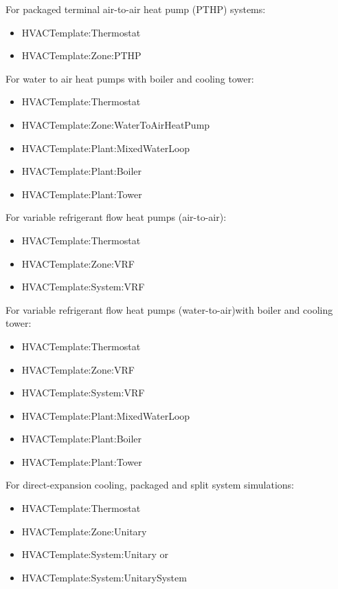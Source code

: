 For packaged terminal air-to-air heat pump (PTHP) systems:

\begin{itemize}
\item
  HVACTemplate:Thermostat
\item
  HVACTemplate:Zone:PTHP
\end{itemize}

For water to air heat pumps with boiler and cooling tower:

\begin{itemize}
\item
  HVACTemplate:Thermostat
\item
  HVACTemplate:Zone:WaterToAirHeatPump
\item
  HVACTemplate:Plant:MixedWaterLoop
\item
  HVACTemplate:Plant:Boiler
\item
  HVACTemplate:Plant:Tower
\end{itemize}

For variable refrigerant flow heat pumps (air-to-air):

\begin{itemize}
\item
  HVACTemplate:Thermostat
\item
  HVACTemplate:Zone:VRF
\item
  HVACTemplate:System:VRF
\end{itemize}

For variable refrigerant flow heat pumps (water-to-air)with boiler and cooling tower:

\begin{itemize}
\item
  HVACTemplate:Thermostat
\item
  HVACTemplate:Zone:VRF
\item
  HVACTemplate:System:VRF
\item
  HVACTemplate:Plant:MixedWaterLoop
\item
  HVACTemplate:Plant:Boiler
\item
  HVACTemplate:Plant:Tower
\end{itemize}

For direct-expansion cooling, packaged and split system simulations:

\begin{itemize}
\item
  HVACTemplate:Thermostat
\item
  HVACTemplate:Zone:Unitary
\item
  HVACTemplate:System:Unitary or
\item
  HVACTemplate:System:UnitarySystem
\end{itemize}

